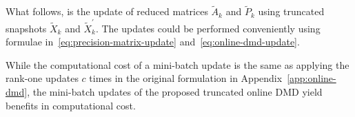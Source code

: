 What follows, is the update of reduced matrices \(\tilde{A}_k\) and \(\tilde{P}_k\) using truncated snapshots \(\tilde{X}_k\) and \(\tilde{X}^\prime_k\). The updates could be performed conveniently using formulae in~\eqref{eq:precision-matrix-update} and~\eqref{eq:online-dmd-update}.

While the computational cost of a mini-batch update is the same as applying the rank-one updates \(c\) times in the original formulation in Appendix~\ref{app:online-dmd}, the mini-batch updates of the proposed truncated online DMD yield benefits in computational cost.
